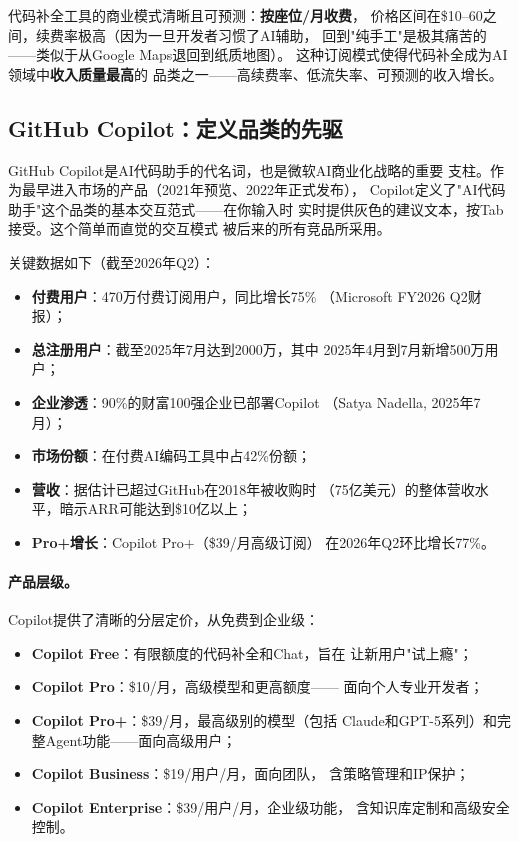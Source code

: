 代码补全工具的商业模式清晰且可预测：\textbf{按座位/月收费}，
价格区间在\$10--60之间，续费率极高（因为一旦开发者习惯了AI辅助，
回到"纯手工"是极其痛苦的——类似于从Google Maps退回到纸质地图）。
这种订阅模式使得代码补全成为AI领域中\textbf{收入质量最高}的
品类之一——高续费率、低流失率、可预测的收入增长。

\subsection{GitHub Copilot：定义品类的先驱}
\label{subsec:copilot}

GitHub Copilot是AI代码助手的代名词，也是微软AI商业化战略的重要
支柱。作为最早进入市场的产品（2021年预览、2022年正式发布），
Copilot定义了"AI代码助手"这个品类的基本交互范式——在你输入时
实时提供灰色的建议文本，按Tab接受。这个简单而直觉的交互模式
被后来的所有竞品所采用。

关键数据如下（截至2026年Q2）：

\begin{itemize}
  \item \textbf{付费用户}：470万付费订阅用户，同比增长75\%
    （Microsoft FY2026 Q2财报）；
  \item \textbf{总注册用户}：截至2025年7月达到2000万，其中
    2025年4月到7月新增500万用户；
  \item \textbf{企业渗透}：90\%的财富100强企业已部署Copilot
    （Satya Nadella, 2025年7月）；
  \item \textbf{市场份额}：在付费AI编码工具中占42\%份额；
  \item \textbf{营收}：据估计已超过GitHub在2018年被收购时
    （75亿美元）的整体营收水平，暗示ARR可能达到\$10亿以上；
  \item \textbf{Pro+增长}：Copilot Pro+（\$39/月高级订阅）
    在2026年Q2环比增长77\%。
\end{itemize}

\paragraph{产品层级。}
Copilot提供了清晰的分层定价，从免费到企业级：
\begin{itemize}
  \item \textbf{Copilot Free}：有限额度的代码补全和Chat，旨在
    让新用户"试上瘾"；
  \item \textbf{Copilot Pro}：\$10/月，高级模型和更高额度——
    面向个人专业开发者；
  \item \textbf{Copilot Pro+}：\$39/月，最高级别的模型（包括
    Claude和GPT-5系列）和完整Agent功能——面向高级用户；
  \item \textbf{Copilot Business}：\$19/用户/月，面向团队，
    含策略管理和IP保护；
  \item \textbf{Copilot Enterprise}：\$39/用户/月，企业级功能，
    含知识库定制和高级安全控制。
\end{itemize}

